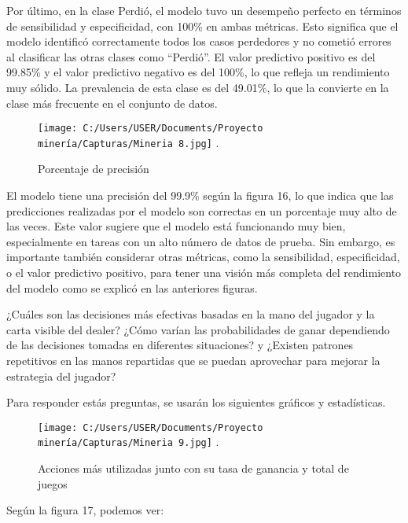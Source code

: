\documentclass[conference,final,]{IEEEtran}
\begin{document}
Por último, en la clase Perdió, el modelo tuvo un desempeño perfecto en
términos de sensibilidad y especificidad, con 100\% en ambas métricas.
Esto significa que el modelo identificó correctamente todos los casos
perdedores y no cometió errores al clasificar las otras clases como
``Perdió''. El valor predictivo positivo es del 99.85\% y el valor
predictivo negativo es del 100\%, lo que refleja un rendimiento muy
sólido. La prevalencia de esta clase es del 49.01\%, lo que la convierte
en la clase más frecuente en el conjunto de datos.

\begin{figure}[htbp]
\centering
\texttt{[image: C:/Users/USER/Documents/Proyecto minería/Capturas/Mineria 8.jpg]}
\DeclareGraphicsExtensions.
\caption{Porcentaje de precisión}
\label{Mineria 8}
\end{figure}

El modelo tiene una precisión del 99.9\% según la figura 16, lo que
indica que las predicciones realizadas por el modelo son correctas en un
porcentaje muy alto de las veces. Este valor sugiere que el modelo está
funcionando muy bien, especialmente en tareas con un alto número de
datos de prueba. Sin embargo, es importante también considerar otras
métricas, como la sensibilidad, especificidad, o el valor predictivo
positivo, para tener una visión más completa del rendimiento del modelo
como se explicó en las anteriores figuras.

¿Cuáles son las decisiones más efectivas basadas en la mano del jugador
y la carta visible del dealer? ¿Cómo varían las probabilidades de ganar
dependiendo de las decisiones tomadas en diferentes situaciones? y
¿Existen patrones repetitivos en las manos repartidas que se puedan
aprovechar para mejorar la estrategia del jugador?

Para responder estás preguntas, se usarán los siguientes gráficos y
estadísticas.

\begin{figure}[htbp]
\centering
\texttt{[image: C:/Users/USER/Documents/Proyecto minería/Capturas/Mineria 9.jpg]}
\DeclareGraphicsExtensions.
\caption{Acciones más utilizadas junto con su tasa de ganancia y total de juegos}
\label{Mineria 9}
\end{figure}

Según la figura 17, podemos ver:
\end{document}
